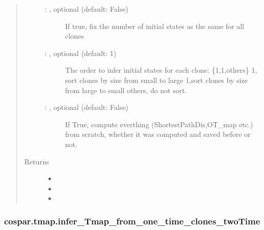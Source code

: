 \documentclass[letterpaper,10pt,english]{sphinxmanual}
\begin{document}
\begin{fulllineitems}
\begin{quote}
\begin{description}
\begin{description}
\item[{ : , optional (default: False)}] \leavevmode
If true, fix the number of initial states as the same for all clones

\item[{ : , optional (default: 1)}] \leavevmode
The order to infer initial states for each clone: \{1,\sphinxhyphen{}1,others\}
1, sort clones by size from small to large
\sphinxhyphen{}1,sort clones by size from large to small
others, do not sort.

\item[{ : , optional (default: False)}] \leavevmode
If True, compute everthing (ShortestPathDis,OT\_map etc.) from scratch,
whether it was computed and saved before or not.

\end{description}

\item[{Returns}] \leavevmode
\begin{itemize}
\item {} 

\item {} 

\item {} 

\end{itemize}


\end{description}\end{quote}

\end{fulllineitems}



\subsubsection{cospar.tmap.infer\_Tmap\_from\_one\_time\_clones\_twoTime}
\label{\detokenize{cospar.tmap.infer_Tmap_from_one_time_clones_twoTime:cospar-tmap-infer-tmap-from-one-time-clones-twotime}}\label{\detokenize{cospar.tmap.infer_Tmap_from_one_time_clones_twoTime::doc}}
\end{document}
